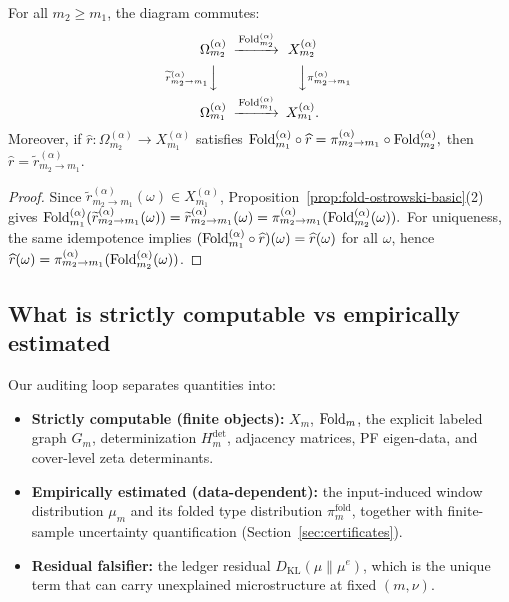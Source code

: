 \begin{proposition}\label{prop:fold-ostrowski-commute-unique}
For all $m_2\ge m_1$, the diagram commutes:
\[
\begin{CD}
\Omega_{m_2}^{(\alpha)} @>{\Fold_{m_2}^{(\alpha)}}>> X_{m_2}^{(\alpha)}\\
@V{\widetilde r^{(\alpha)}_{m_2\to m_1}}VV @VV{\pi^{(\alpha)}_{m_2\to m_1}}V\\
\Omega_{m_1}^{(\alpha)} @>{\Fold_{m_1}^{(\alpha)}}>> X_{m_1}^{(\alpha)}.
\end{CD}
\]
Moreover, if $\widehat r:\Omega_{m_2}^{(\alpha)}\to X_{m_1}^{(\alpha)}$ satisfies
\(
\mathrm{Fold}_{m_1}^{(\alpha)}\circ \widehat r=\pi^{(\alpha)}_{m_2\to m_1}\circ\mathrm{Fold}_{m_2}^{(\alpha)},
\)
then $\widehat r=\widetilde r^{(\alpha)}_{m_2\to m_1}$.
\end{proposition}
\begin{proof}
Since $\widetilde r^{(\alpha)}_{m_2\to m_1}(\omega)\in X_{m_1}^{(\alpha)}$, Proposition~\ref{prop:fold-ostrowski-basic}(2) gives
\(
\mathrm{Fold}_{m_1}^{(\alpha)}(\widetilde r^{(\alpha)}_{m_2\to m_1}(\omega))=\widetilde r^{(\alpha)}_{m_2\to m_1}(\omega)
=\pi^{(\alpha)}_{m_2\to m_1}(\mathrm{Fold}_{m_2}^{(\alpha)}(\omega)).
\)
For uniqueness, the same idempotence implies $(\mathrm{Fold}_{m_1}^{(\alpha)}\circ\widehat r)(\omega)=\widehat r(\omega)$ for all $\omega$, hence $\widehat r(\omega)=\pi^{(\alpha)}_{m_2\to m_1}(\mathrm{Fold}_{m_2}^{(\alpha)}(\omega))$.
\end{proof}

\subsection{What is strictly computable vs empirically estimated}\label{subsec:extensions-computable-vs-estimated}
Our auditing loop separates quantities into:
\begin{itemize}
  \item \textbf{Strictly computable (finite objects):} $X_m$, $\mathrm{Fold}_m$, the explicit labeled graph $G_m$, determinization $H_m^{\mathrm{det}}$, adjacency matrices, PF eigen-data, and cover-level zeta determinants.
  \item \textbf{Empirically estimated (data-dependent):} the input-induced window distribution $\mu_m$ and its folded type distribution $\pi_m^{\mathrm{fold}}$, together with finite-sample uncertainty quantification (Section~\ref{sec:certificates}).
  \item \textbf{Residual falsifier:} the ledger residual $D_{\mathrm{KL}}(\mu\|\mu^e)$, which is the unique term that can carry unexplained microstructure at fixed $(m,\nu)$.
  \end{itemize}

